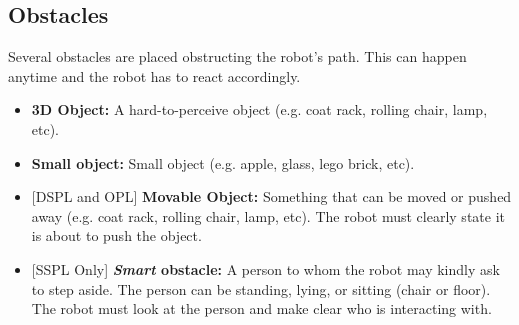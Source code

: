 \subsection{Obstacles}
\label{sec:helpmecarry_obstacles}
Several obstacles are placed obstructing the robot's path. This can happen anytime and the robot has to react accordingly.
\begin{itemize}
  \item \textbf{3D Object:} A hard-to-perceive object
  (e.g. coat rack, rolling chair, lamp, etc).

  \item \textbf{Small object:} Small object
  (e.g. apple, glass, lego brick, etc).

  \item {[DSPL and OPL]} \textbf{Movable Object:} Something that can be moved or pushed away
  (e.g. coat rack, rolling chair, lamp, etc).
  The robot must clearly state it is about to push the object.

  \item {[SSPL Only]} \textbf{\textit{Smart} obstacle:} A person to whom the robot may kindly ask to step aside.
  The person can be standing, lying, or sitting (chair or floor).
  The robot must look at the person and make clear who is interacting with.
\end{itemize}


